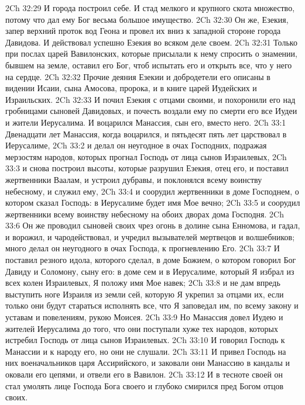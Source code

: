 \vs 2Ch 32:29 И города построил себе. И стад мелкого и крупного скота  множество, потому что дал ему Бог весьма большое имущество.
\vs 2Ch 32:30 Он же, Езекия, запер верхний проток вод Геона и провел их вниз к западной стороне города Давидова. И действовал успешно Езекия во всяком деле своем.
\vs 2Ch 32:31 Только при послах царей Вавилонских, которые присылали к нему спросить о знамении, бывшем на земле, оставил его Бог, чтоб испытать его и открыть все, что у него на сердце.
\rsbpar\vs 2Ch 32:32 Прочие деяния Езекии и добродетели его описаны в видении Исаии, сына Амосова, пророка, и в книге царей Иудейских и Израильских.
\vs 2Ch 32:33 И почил Езекия с отцами своими, и похоронили его над гробницами сыновей Давидовых, и почесть воздали ему по смерти его все Иудеи и жители Иерусалима. И воцарился Манассия, сын его, вместо него.
\vs 2Ch 33:1 Двенадцати лет  Манассия, когда воцарился, и пятьдесят пять лет царствовал в Иерусалиме,
\vs 2Ch 33:2 и делал он неугодное в очах Господних, подражая мерзостям народов, которых прогнал Господь от лица сынов Израилевых,
\vs 2Ch 33:3 и снова построил высоты, которые разрушил Езекия, отец его, и поставил жертвенники Ваалам, и устроил дубравы, и поклонялся всему воинству небесному, и служил ему,
\vs 2Ch 33:4 и соорудил жертвенники в доме Господнем, о котором сказал Господь: в Иерусалиме будет имя Мое вечно;
\vs 2Ch 33:5 и соорудил жертвенники всему воинству небесному на обоих дворах дома Господня.
\vs 2Ch 33:6 Он же проводил сыновей своих чрез огонь в долине сына Енномова, и гадал, и ворожил, и чародействовал, и учредил вызывателей мертвецов и волшебников; много делал он неугодного в очах Господа, к прогневлению Его.
\vs 2Ch 33:7 И поставил резного идола, которого сделал, в доме Божием, о котором говорил Бог Давиду и Соломону, сыну его: в доме сем и в Иерусалиме, который Я избрал из всех колен Израилевых, Я положу имя Мое навек;
\vs 2Ch 33:8 и не дам впредь выступить ноге Израиля из земли сей, которую Я укрепил за отцами их, если только они будут стараться исполнять все, что Я заповедал им, по всему закону и уставам и повелениям,  рукою Моисея.
\vs 2Ch 33:9 Но Манассия довел Иудею и жителей Иерусалима до того, что они поступали хуже тех народов, которых истребил Господь от лица сынов Израилевых.
\rsbpar\vs 2Ch 33:10 И говорил Господь к Манассии и к народу его, но они не слушали.
\vs 2Ch 33:11 И привел Господь на них военачальников царя Ассирийского, и заковали они Манассию в кандалы и оковали его цепями, и отвели его в Вавилон.
\vs 2Ch 33:12 И в тесноте своей он стал умолять лице Господа Бога своего и глубоко смирился пред Богом отцов своих.
